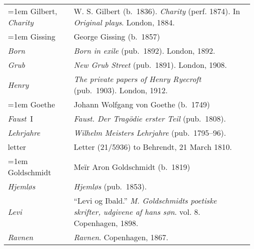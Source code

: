 \begin{xltabular}{\textwidth}{ lQ }
\hangindent=1em  Gilbert, \textit{Charity} & W. S. Gilbert (b.~1836). \textit{Charity} (perf. 1874). In \textit{Original plays}. London, 1884. \\

\hangindent=1em  Gissing & George Gissing (b.~1857) \\
\hspace{1em}\textit{Born} & \textit{Born in exile} (pub.~1892). London, 1892. \\
\hspace{1em}\textit{Grub} & \textit{New Grub Street} (pub.~1891). London, 1908. \\
\hspace{1em}\textit{Henry} & \textit{The private papers of Henry Ryecroft} (pub.~1903). London, 1912. \\

\hangindent=1em  Goethe & Johann Wolfgang von Goethe (b.~1749) \\
\hspace{1em}\textit{Faust}~I & \textit{Faust. Der Tragödie erster Teil} (pub.~1808). \\
\hspace{1em}\textit{Lehrjahre} & \textit{Wilhelm Meisters Lehrjahre} (pub.~1795–96). \\
\hspace{1em}letter & Letter (21/5936) to Behrendt, 21 March 1810. \\ %

\hangindent=1em  Goldschmidt & Meïr Aron Goldschmidt (b.~1819) \\
\hspace{1em}\textit{Hjemløs} & \textit{Hjemløs} (pub.~1853). \\ %
\hspace{1em}\textit{Levi} & ``Levi og Ibald.'' \textit{M. Goldschmidts poetiske skrifter, udgivene af hans søn}. vol. 8. Copenhagen, 1898. \\ 
\hspace{1em}\textit{Ravnen} & \textit{Ravnen}. Copenhagen, 1867. \\ %


\end{xltabular}
